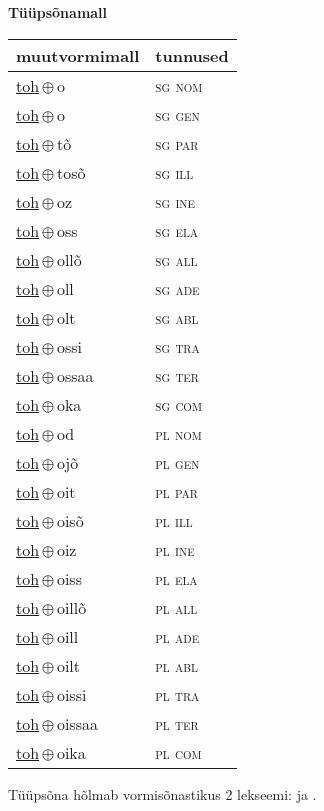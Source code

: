 

\vspace{3.5em}
\noindent \begin{minipage}{\textwidth}
\noindent \textbf{Tüüpsõnamall \,}\\

\begin{sideways}
\begin{tabular}{l l}
muutvormimall & tunnused \\
\hline
\underline{toh}\,$\oplus$\,o & \textsc{ sg nom } \\
\underline{toh}\,$\oplus$\,o & \textsc{ sg gen } \\
\underline{toh}\,$\oplus$\,tõ & \textsc{ sg par } \\
\underline{toh}\,$\oplus$\,tosõ & \textsc{ sg ill } \\
\underline{toh}\,$\oplus$\,oz & \textsc{ sg ine } \\
\underline{toh}\,$\oplus$\,oss & \textsc{ sg ela } \\
\underline{toh}\,$\oplus$\,ollõ & \textsc{ sg all } \\
\underline{toh}\,$\oplus$\,oll & \textsc{ sg ade } \\
\underline{toh}\,$\oplus$\,olt & \textsc{ sg abl } \\
\underline{toh}\,$\oplus$\,ossi & \textsc{ sg tra } \\
\underline{toh}\,$\oplus$\,ossaa & \textsc{ sg ter } \\
\underline{toh}\,$\oplus$\,oka & \textsc{ sg com } \\
\underline{toh}\,$\oplus$\,od & \textsc{ pl nom } \\
\underline{toh}\,$\oplus$\,ojõ & \textsc{ pl gen } \\
\underline{toh}\,$\oplus$\,oit & \textsc{ pl par } \\
\underline{toh}\,$\oplus$\,oisõ & \textsc{ pl ill } \\
\underline{toh}\,$\oplus$\,oiz & \textsc{ pl ine } \\
\underline{toh}\,$\oplus$\,oiss & \textsc{ pl ela } \\
\underline{toh}\,$\oplus$\,oillõ & \textsc{ pl all } \\
\underline{toh}\,$\oplus$\,oill & \textsc{ pl ade } \\
\underline{toh}\,$\oplus$\,oilt & \textsc{ pl abl } \\
\underline{toh}\,$\oplus$\,oissi & \textsc{ pl tra } \\
\underline{toh}\,$\oplus$\,oissaa & \textsc{ pl ter } \\
\underline{toh}\,$\oplus$\,oika & \textsc{ pl com } \\
\end{tabular}
\end{sideways}
\label{tab:tüüpsõnamall-toho}

\end{minipage}

 
\vspace{1em}
\noindent Tüüpsõna hõlmab vormisõnastikus 2 lekseemi:  ja .
